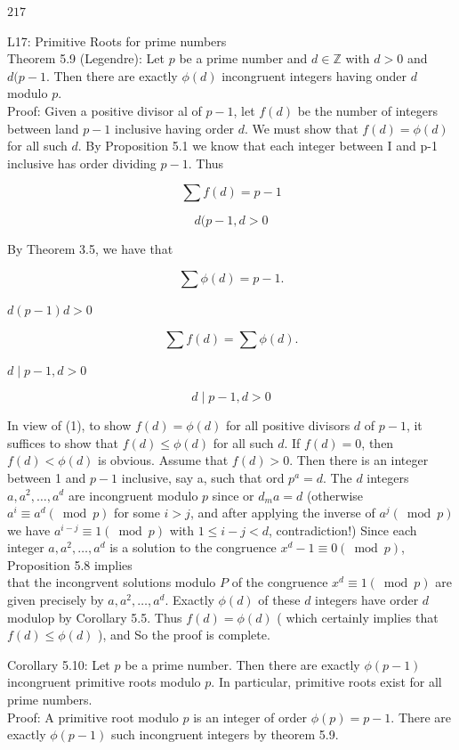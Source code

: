 \documentclass[10pt]{article}
\begin{document}
$217$

L17: Primitive Roots for prime numbers\\
Theorem 5.9 (Legendre): Let $p$ be a prime number and $d \in \mathbb{Z}$ with $d>0$ and $d(p-1$. Then there are exactly $\phi(d)$ incongruent integers having onder $d$ modulo $p$.\\
Proof: Given a positive divisor al of $p-1$, let $f(d)$ be the number of integers between land $p-1$ inclusive having order $d$. We must show that $f(d)=\phi(d)$ for all such $d$. By Proposition 5.1 we know that each integer between I and p-1 inclusive has order dividing $p-1$. Thus

$$
\sum f(d)=p-1
$$

$$
d(p-1, d>0
$$

By Theorem 3.5, we have that

$$
\sum \phi(d)=p-1 .
$$

$d(p-1) d>0$


\begin{equation*}
\sum f(d)=\sum \phi(d) . \tag{1}
\end{equation*}


$d \mid p-1, d>0$

$$
d \mid p-1, d>0
$$

In view of (1), to show $f(d)=\phi(d)$ for all positive divisors $d$ of $p-1$, it suffices to show that $f(d) \leq \phi(d)$ for all such $d$. If $f(d)=0$, then $f(d)<\phi(d)$ is obvious. Assume that $f(d)>0$. Then there is an integer between 1 and $p-1$ inclusive, say a, such that ord $p^{a}=d$. The $d$ integers $a, a^{2}, \ldots, a^{d}$ are incongruent modulo $p$ since or $d_{m} a=d$ (otherwise $a^{i} \equiv a^{d}(\bmod p)$ for some $i>j$, and after applying the inverse of $a^{j}(\bmod p)$ we have $a^{i-j} \equiv 1(\bmod p)$ with $1 \leq i-j<d$, contradiction!) Since each integer $a, a^{2}, \ldots, a^{d}$ is a solution to the congruence $x^{d}-1 \equiv 0(\bmod p)$, Proposition 5.8 implies\\
that the incongrvent solutions modulo $P$ of the congruence $x^{d} \equiv 1(\bmod p)$ are given precisely by $a, a^{2}, \ldots, a^{d}$. Exactly $\phi(d)$ of these $d$ integers have order $d$ modulop by Corollary 5.5. Thus $f(d)=\phi(d)$ ( which certainly implies that $f(d) \leqslant \phi(d)$ ), and So the proof is complete.

Corollary 5.10: Let $p$ be a prime number. Then there are exactly $\phi(p-1)$ incongruent primitive roots modulo $p$. In particular, primitive roots exist for all prime numbers.\\
Proof: A primitive root modulo $p$ is an integer of order $\phi(p)=p-1$. There are exactly $\phi(p-1)$ such incongruent integers by theorem 5.9.
\end{document}
